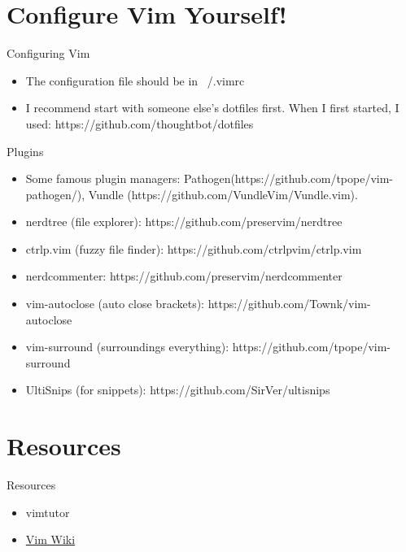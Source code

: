 \documentclass[10pt]{beamer}
\begin{document}
\section{Configure Vim Yourself!}
\begin{frame}{Configuring Vim}
  \begin{itemize}
    \item<1-> The configuration file should be in ~/.vimrc
    \item<2-> I recommend start with someone else's dotfiles first. When I first started, I used: https://github.com/thoughtbot/dotfiles
  \end{itemize}
\end{frame}

\begin{frame}{Plugins}
  \begin{itemize}
    \item Some famous plugin managers: Pathogen(https://github.com/tpope/vim-pathogen/), Vundle (https://github.com/VundleVim/Vundle.vim).
    \item nerdtree (file explorer): https://github.com/preservim/nerdtree
    \item ctrlp.vim (fuzzy file finder): https://github.com/ctrlpvim/ctrlp.vim
    \item nerdcommenter: https://github.com/preservim/nerdcommenter
    \item vim-autoclose (auto close brackets): https://github.com/Townk/vim-autoclose
    \item vim-surround (surroundings everything): https://github.com/tpope/vim-surround
    \item UltiSnips (for snippets): https://github.com/SirVer/ultisnips
  \end{itemize}
\end{frame}


\section{Resources}
\begin{frame}{Resources}
  \begin{itemize}
    \item vimtutor
    \item \href{https://vim.fandom.com/wiki/Vim_Tips_Wiki}{Vim Wiki}
  \end{itemize}
\end{frame}
\end{document}
